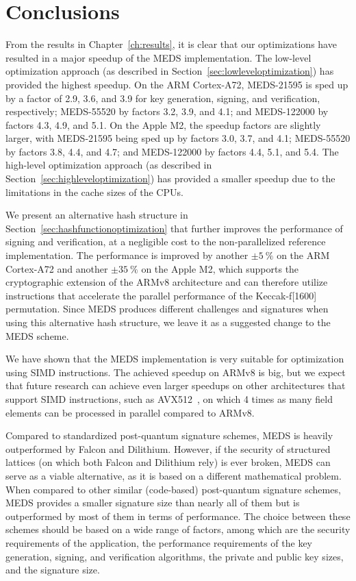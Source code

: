 \documentclass[11pt,a4paper]{report}
\theoremstyle{definition}
\begin{document}
\chapter{Conclusions}
\label{ch:conclusion}
From the results in Chapter~\ref{ch:results}, it is clear that our optimizations have resulted in a major speedup of the MEDS implementation. The low-level optimization approach (as described in Section~\ref{sec:lowleveloptimization}) has provided the highest speedup. On the ARM Cortex-A72, MEDS-21595 is sped up by a factor of 2.9, 3.6, and 3.9 for key generation, signing, and verification, respectively; MEDS-55520 by factors 3.2, 3.9, and 4.1; and MEDS-122000 by factors 4.3, 4.9, and 5.1. On the Apple M2, the speedup factors are slightly larger, with MEDS-21595 being sped up by factors 3.0, 3.7, and 4.1; MEDS-55520 by factors 3.8, 4.4, and 4.7; and MEDS-122000 by factors 4.4, 5.1, and 5.4. The high-level optimization approach (as described in Section~\ref{sec:highleveloptimization}) has provided a smaller speedup due to the limitations in the cache sizes of the CPUs.

We present an alternative hash structure in Section~\ref{sec:hashfunctionoptimization} that further improves the performance of signing and verification, at a negligible cost to the non-parallelized reference implementation. The performance is improved by another $\pm5~\%$ on the ARM Cortex-A72 and another $\pm35~\%$ on the Apple M2, which supports the cryptographic extension of the ARMv8 architecture and can therefore utilize instructions that accelerate the parallel performance of the Keccak-f[1600] permutation. Since MEDS produces different challenges and signatures when using this alternative hash structure, we leave it as a suggested change to the MEDS scheme.

We have shown that the MEDS implementation is very suitable for optimization using SIMD instructions. The achieved speedup on ARMv8 is big, but we expect that future research can achieve even larger speedups on other architectures that support SIMD instructions, such as AVX512~\cite{intel-avx512}, on which 4 times as many field elements can be processed in parallel compared to ARMv8.

Compared to standardized post-quantum signature schemes, MEDS is heavily outperformed by Falcon and Dilithium. However, if the security of structured lattices (on which both Falcon and Dilithium rely) is ever broken, MEDS can serve as a viable alternative, as it is based on a different mathematical problem. When compared to other similar (code-based) post-quantum signature schemes, MEDS provides a smaller signature size than nearly all of them but is outperformed by most of them in terms of performance. The choice between these schemes should be based on a wide range of factors, among which are the security requirements of the application, the performance requirements of the key generation, signing, and verification algorithms, the private and public key sizes, and the signature size.
\end{document}
